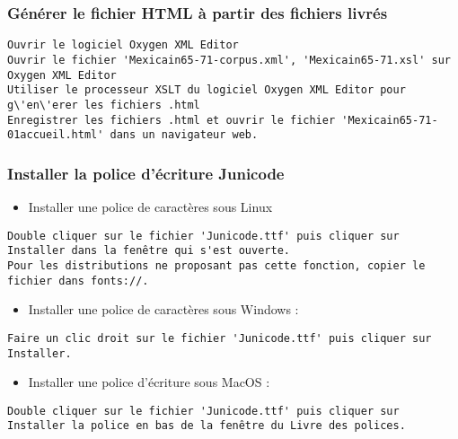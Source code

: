 \documentclass[a4paper,twoside,12pt]{article}
\begin{document}
\subsubsection{G\'en\'erer le fichier HTML \`a partir des fichiers livr\'es}

\begin{lstlisting}
Ouvrir le logiciel Oxygen XML Editor
Ouvrir le fichier 'Mexicain65-71-corpus.xml', 'Mexicain65-71.xsl' sur Oxygen XML Editor
Utiliser le processeur XSLT du logiciel Oxygen XML Editor pour g\'en\'erer les fichiers .html
Enregistrer les fichiers .html et ouvrir le fichier 'Mexicain65-71-01accueil.html' dans un navigateur web.
\end{lstlisting}

\subsubsection{Installer la police d'\'ecriture Junicode}

\begin{itemize}
	\item Installer une police de caract\`eres sous Linux
\end{itemize}

\begin{lstlisting}
Double cliquer sur le fichier 'Junicode.ttf' puis cliquer sur Installer dans la fenêtre qui s'est ouverte.
Pour les distributions ne proposant pas cette fonction, copier le fichier dans fonts://.
\end{lstlisting}

\begin{itemize}
	\item Installer une police de caract\`eres sous Windows :
\end{itemize}

\begin{lstlisting}
Faire un clic droit sur le fichier 'Junicode.ttf' puis cliquer sur Installer.
\end{lstlisting}

\begin{itemize}
	\item Installer une police d'\'ecriture sous MacOS :
\end{itemize}

\begin{lstlisting}
Double cliquer sur le fichier 'Junicode.ttf' puis cliquer sur Installer la police en bas de la fenêtre du Livre des polices.
\end{lstlisting}
\end{document}
